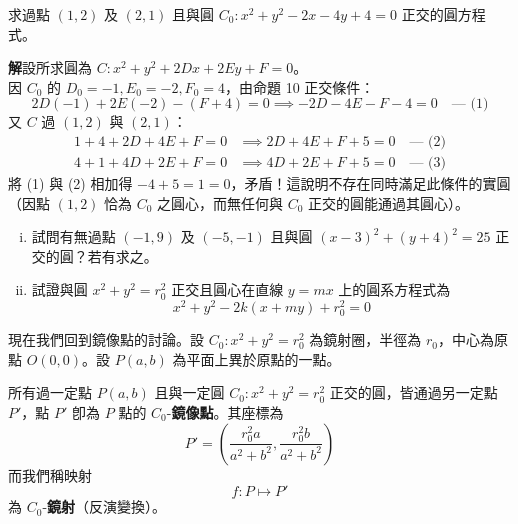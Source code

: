 \begin{example}
求過點 $(1,2)$ 及 $(2,1)$ 且與圓 $C_0 : x^2 + y^2 - 2x - 4y + 4 = 0$ 正交的圓方程式。

\textbf{解}\quad 設所求圓為 $C : x^2 + y^2 + 2Dx + 2Ey + F = 0$。\\
因 $C_0$ 的 $D_0 = -1, E_0 = -2, F_0 = 4$，由命題 10 正交條件：
\[ 2D(-1) + 2E(-2) - (F + 4) = 0 \implies -2D - 4E - F - 4 = 0 \quad \text{--- (1)} \]
又 $C$ 過 $(1,2)$ 與 $(2,1)$：
\begin{align*}
1 + 4 + 2D + 4E + F = 0 &\implies 2D + 4E + F + 5 = 0 \quad \text{--- (2)} \\
4 + 1 + 4D + 2E + F = 0 &\implies 4D + 2E + F + 5 = 0 \quad \text{--- (3)}
\end{align*}
將 (1) 與 (2) 相加得 $-4 + 5 = 1 = 0$，矛盾！這說明不存在同時滿足此條件的實圓（因點 $(1,2)$ 恰為 $C_0$ 之圓心，而無任何與 $C_0$ 正交的圓能通過其圓心）。
\end{example}

\begin{exercise}
\begin{enumerate}[(i)]
  \item 試問有無過點 $(-1,9)$ 及 $(-5,-1)$ 且與圓 $(x-3)^2 + (y+4)^2 = 25$ 正交的圓？若有求之。
  \item 試證與圓 $x^2 + y^2 = r_0^2$ 正交且圓心在直線 $y = mx$ 上的圓系方程式為
  \[ x^2 + y^2 - 2k(x + my) + r_0^2 = 0 \]
\end{enumerate}
\end{exercise}

現在我們回到鏡像點的討論。設 $C_0 : x^2 + y^2 = r_0^2$ 為鏡射圈，半徑為 $r_0$，中心為原點 $O(0,0)$。設 $P(a,b)$ 為平面上異於原點的一點。

\begin{theorem}
所有過一定點 $P(a,b)$ 且與一定圓 $C_0 : x^2 + y^2 = r_0^2$ 正交的圓，皆通過另一定點 $P'$，點 $P'$ 卽為 $P$ 點的 $C_0$-\textbf{鏡像點}。其座標為
\begin{equation}
P' = \left(\frac{r_0^2 a}{a^2 + b^2}, \frac{r_0^2 b}{a^2 + b^2}\right) \label{eq:b4-3-6-inversion}
\end{equation}
而我們稱映射
\[ f : P \mapsto P' \]
為 $C_0$-\textbf{鏡射}（反演變換）。
\end{theorem}

